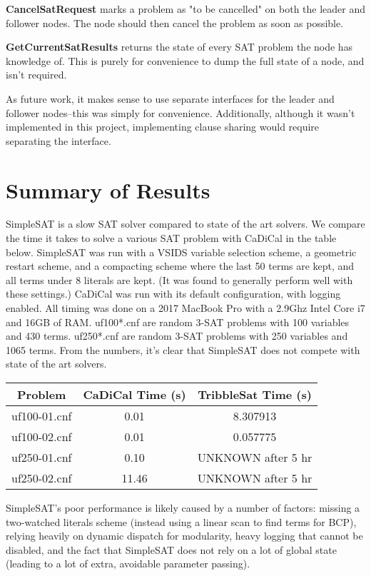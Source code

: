 \documentclass[10pt]{article}
\begin{document}
	\textbf{CancelSatRequest} marks a problem as "to be cancelled" on both the leader and follower nodes.  The node should then cancel the problem as soon as possible.
  	
	\textbf{GetCurrentSatResults} returns the state of every SAT problem the node has knowledge of.  This is purely for convenience to dump the full state of a node, and isn't required.
	
  As future work, it makes sense to use separate interfaces for the leader and follower nodes--this was simply for convenience.  Additionally, although it wasn't implemented in this project, implementing
  clause sharing would require separating the interface.

\section{Summary of Results}

  SimpleSAT is a slow SAT solver compared to state of the art solvers.  We compare the time it takes to solve a various SAT problem with CaDiCal in the table below.  SimpleSAT was run with a VSIDS variable selection
  scheme, a geometric restart scheme, and a compacting scheme where the last 50 terms are kept, and all terms under 8 literals are kept.  (It was found to generally perform well with these settings.)  CaDiCal was run with
  its default configuration, with logging enabled.  All timing was done on a 2017 MacBook Pro with a 2.9Ghz Intel Core i7 and 16GB of RAM.  uf100*.cnf are random 3-SAT problems with 100 variables and 430 terms.  uf250*.cnf
  are random 3-SAT problems with 250 variables and 1065 terms.  From the numbers, it's clear that SimpleSAT does not compete with state of the art solvers.
 
 \begin{center}
 \begin{tabular}{||c c c||} 
 \hline
 Problem & CaDiCal Time (s) & TribbleSat Time (s) \\ [0.5ex] 
 \hline\hline
 uf100-01.cnf & 0.01 &  8.307913 \\ 
 \hline
 uf100-02.cnf & 0.01 & 0.057775 \\ 
 \hline
 uf250-01.cnf & 0.10 &  UNKNOWN after 5 hr \\ 
 \hline
 uf250-02.cnf & 11.46 & UNKNOWN after 5 hr \\
 \hline
\end{tabular}
\end{center}
  
  SimpleSAT's poor performance is likely caused by a number of factors:  missing a two-watched literals scheme (instead using a linear scan to find terms for BCP), relying heavily on dynamic dispatch for modularity,
  heavy logging that cannot be disabled, and the fact that SimpleSAT does not rely on a lot of global state (leading to a lot of extra, avoidable parameter passing).
\end{document}
